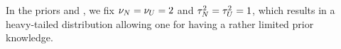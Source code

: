 In the priors  and , we fix $\nu_N = \nu_U = 2$ and $\tau^2_N = \tau^2_U = 1$, which results in a heavy-tailed distribution allowing one for having a rather limited prior knowledge.
